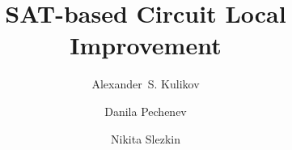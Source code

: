 \documentclass[a4paper, USenglish, cleveref, autoref, thm-restate]{lipics-v2021}
\title{SAT-based Circuit Local Improvement} %
\author{Alexander~S. Kulikov}{Steklov Mathematical Institute at St.~Petersburg, Russian Academy of Sciences \and St.~Petersburg State University \and \url{https://logic.pdmi.ras.ru/~kulikov/}}{kulikov@logic.pdmi.ras.ru}{https://orcid.org/0000-0002-5656-0336}{Supported by Russian Science Foundation (18-71-10042).}
\author{Danila Pechenev}{St.~Petersburg State University}{danil-pechenev@mail.ru}{https://orcid.org/0000-0003-0575-0807}{}
\author{Nikita Slezkin}{St.~Petersburg State University}{ne.slezkin@gmail.com}{https://orcid.org/0000-0003-1904-9261}{}
\begin{document}
    \sloppy
    
\end{document}
